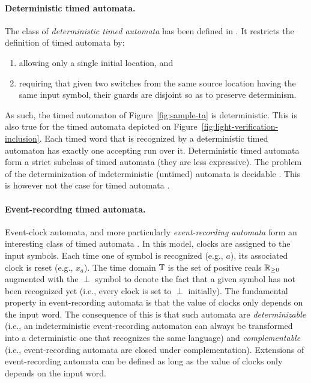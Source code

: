 \paragraph{Deterministic timed automata.}
The class of \emph{deterministic timed automata} has been defined in \cite{RADLD94}. It restricts the definition of timed automata by:
\begin{enumerate}
  
  \item allowing only a single initial location, and
  
  \item requiring that given two switches from the same source location having the same input symbol, their guards are disjoint so as to preserve determinism.
  
\end{enumerate}
As such, the timed automaton of Figure~\ref{fig:sample-ta} is deterministic. This is also true for the timed automata depicted on Figure~\ref{fig:light-verification-inclusion}.
Each timed word that is recognized by a deterministic timed automaton has exactly one accepting run over it. Deterministic timed automata form a strict subclass of timed automata (they are less expressive). The problem of the determinization of indeterministic (untimed) automata is decidable \cite{Hopcroft79}. This is however not the case for timed automata \cite{ST03}.

\paragraph{Event-recording timed automata.}
Event-clock automata, and more particularly \emph{event-recording automata} form an interesting class of timed automata \cite{RALF94}. In this model, clocks are assigned to the input symbols. Each time one of symbol is recognized (e.g., $a$), its associated clock is reset (e.g., $x_a$). The time domain $\mathbb{T}$ is the set of positive reals $\mathbb{R}_{\geq 0}$ augmented with the $\perp$ symbol to denote the fact that a given symbol has not been recognized yet (i.e., every clock is set to $\perp$ initially). The fundamental property in event-recording automata is that the value of clocks only depends on the input word. The consequence of this is that such automata are \emph{determinizable} (i.e., an indeterministic event-recording automaton can always be transformed into a deterministic one that recognizes the same language) and \emph{complementable} (i.e., event-recording automata are closed under complementation). Extensions of event-recording automata can be defined as long as the value of clocks only depends on the input word.

